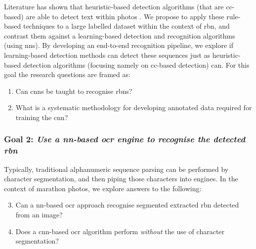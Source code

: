 Literature has shown that heuristic-based detection algorithms (that are \gls{cc}-based) are able to detect text within photos \citep{Li:2012wd, Chen:2011ul, Eichner:2008dw}. We propose to apply these rule-based techniques to a large labelled dataset within the context of \gls{rbn}, and contrast them against a learning-based detection and recognition algorithms (using \glspl{nn}). By developing an end-to-end recognition pipeline, we explore if learning-based detection methods can detect these sequences just as heuristic-based detection algorithms (focusing namely on \gls{cc}-based detection) can.
For this goal the research questions are framed as:
\begin{enumerate}[label=\bfseries~RQ\arabic*), leftmargin=2cm, rightmargin=1.5cm]
  \item\label{rq:1} Can \glspl{cnn} be taught to recognise \glspl{rbn}?
  \item\label{rq:2} What is a systematic methodology for developing annotated data required for training the \gls{cnn}?
\end{enumerate}

\subsubsection*{Goal 2: \itshape Use a \gls{nn}-based \gls{ocr} engine to recognise the detected \gls{rbn}}

Typically, traditional alphanumeric sequence parsing can be performed by character segmentation, and then piping those characters into  engines.
In the context of marathon photos, we explore answers to the following:
\begin{enumerate}[label=\bfseries~RQ\arabic*), leftmargin=2cm, rightmargin=1.5cm]
  \setcounter{enumi}{2}
  \item\label{rq:3} Can a \gls{nn}-based \gls{ocr} approach recognise segmented extracted \gls{rbn} detected from an image?
  \item\label{rq:4} Does a \gls{cnn}-based \gls{ocr} algorithm perform \textit{without} the use of character segmentation?
\end{enumerate}

